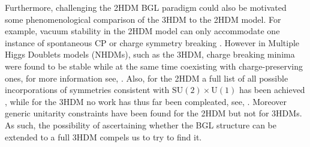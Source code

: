 Furthermore, challenging the 2HDM BGL paradigm could also be motivated some phenomenological comparison of the 3HDM to the 2HDM model. For example, vacuum stability in the 2HDM model can only accommodate one instance of spontaneous CP or charge symmetry breaking \cite{Branco_2012,Ferreira_2004,Barroso_2007}. 
%
However in Multiple Higgs Doublets models (NHDMs), such as the 3HDM, charge breaking minima were found to be stable while at the same time coexisting with charge-preserving ones, for more information see, \cite{Barroso_2006}.   
%
Also, for the 2HDM a full list of all possible incorporations of symmetries consistent with $\mathrm{SU(2)}\times\mathrm{U(1)}$ has been achieved \cite{Ivanov_2008,Ivanov2007}, while for the 3HDM no work has thus far been compleated, see, \cite{Ivanov_2012,Ivanov_2015}. 
%
Moreover generic unitarity constraints have been found for the 2HDM \cite{Ginzburg_2005} but not for 3HDMs. As such, the possibility of
ascertaining whether the BGL structure can be extended to a full 3HDM compels us to try to find it. 

